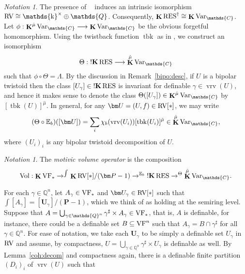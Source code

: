 \documentclass[12pt]{amsart}
\newcommand{\memph}[1]{{\color{magenta}\emph{#1}}}
\theoremstyle{plain}
\theoremstyle{definition}
\theoremstyle{remark}
\newtheorem{nota}[thm]{Notation}
\numberwithin{equation}{section}
\theoremstyle{plain}
\newcommand{\VF}{\textup{VF}}
\newcommand{\RV}{\textup{RV}}
\DeclareMathOperator{\K}{\mathds{k}}
\newcommand{\C}{\mathds{C}}
\newcommand{\Q}{\mathds{Q}}
\newcommand{\0}{\emptyset}
\newcommand{\bb}[1]{\mathbb{#1}}
\newcommand{\fun}{\longrightarrow}
\newcommand{\sub}{\subseteq}
\newcommand{\RES}{\textup{RES}}
\DeclareMathOperator{\rcsn}{\overline {csn}}
\DeclareMathOperator{\ggk}{\mathbf{K}}
\DeclareMathOperator{\sggk}{!\mathbf{K}}
\DeclareMathOperator{\vrv}{vrv}
\newcommand{\var}{\textup{Var}}
\DeclareMathOperator{\Vol}{Vol}
\DeclareMathOperator{\tbk}{tbk}
\newcommand{\gmv}{\ggk^{\hat \mu}\var_{\C}}
\begin{document}
\begin{nota}\label{bipo:gdv}
The presence of $\rcsn$ induces an intrinsic isomorphism $\RV \cong {\K^\times} \oplus \Q$. Consequently, $\ggk \RES^\dag \cong \ggk \var_{\C}$. Let $\phi : \gmv \fun \ggk \var_{\C}$ be the obvious forgetful homomorphism.  Using the twistback function $\tbk$ as in  \cite[\S~4.3]{hru:loe:lef}, we construct an isomorphism
\begin{equation}
\Theta : \sggk \RES \fun \gmv
\end{equation}
such that $\phi \circ \Theta = \Lambda$. By the discussion in Remark~\ref{bipo:desc}, if $U$ is a bipolar twistoid then the class $[U_\gamma] \in \sggk \RES$ is invariant for definable $\gamma \in \vrv(U)$, and hence it makes sense to denote the class $\Theta([U_\gamma]) \in \gmv$ by $[\tbk(U)]^{\hat \mu}$. In general, for any $\bm U = (U, f) \in \RV[*]$, we may write
\begin{equation}\label{twist:C}
  (\Theta \circ \bb E_b)([\bm U]) = \sum_i \chi_b(\vrv(U_i))[\tbk(U_{i})]^{\hat \mu} \in \gmv,
\end{equation}
where $(U_i)_i$ is any bipolar twistoid decomposition of $U$.
\end{nota}


\begin{nota}\label{mov:vol}
The \memph{motivic volume operator} is the composition
\[
  \Vol : \ggk \VF_* \to^{\int} \ggk \RV[*] / (\bm P - 1)    \to^{\bb E_b} \sggk \RES \to^{\Theta} \gmv.
\]
\end{nota}


For each $\gamma \in \Q^n$, let $A_\gamma \in \VF_*$ and $\bm U_\gamma \in \RV[*]$ such that $\int [A_\gamma] = [\bm U_\gamma] / (\bm P - 1)$,  which we think of  as holding at the semiring level. Suppose that $A = \bigcup_{\gamma \in \Q^n} \gamma^\sharp  \times A_\gamma \in \VF_*$, that is, $A$ is definable, for instance,  there could be a definable set $B \sub \VF^n$ such that $A_\gamma = B \cap \gamma^\sharp$ for all $\gamma \in \Q^n$. For ease of notation, we take each $\bm U_\gamma$ to be simply a definable set $U_\gamma$ in $\RV$ and assume, by compactness, $U = \bigcup_{\gamma \in \Q^n} \gamma^\sharp  \times U_\gamma$ is definable as well. By Lemma~\ref{coh:decom} and compactness again, there is a definable finite partition $(D_i)_i$ of $\vrv(U)$ such that
\end{document}
